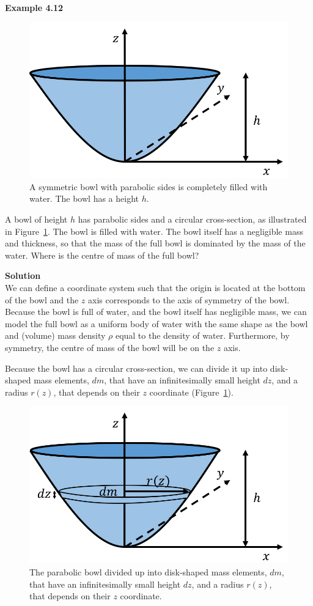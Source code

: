 \begin{framed}
\textbf{Example 4.12}\\
\begin{figure}[!htbp]
\centering
\includegraphics[width=0.5\linewidth]{files/cmbowl-1d1b369d890b85728f882628aa960aeb.png}
\caption[]{A symmetric bowl with parabolic sides is completely filled with water. The bowl has a height $h$.}
\label{fig:momentumandcm:cmbowl}
\end{figure}

A bowl of height $h$ has parabolic sides and a circular cross-section, as illustrated in Figure~\ref{fig:momentumandcm:cmbowl}. The bowl is filled with water. The bowl itself has a negligible mass and thickness, so that the mass of the full bowl is dominated by the mass of the water. Where is the centre of mass of the full bowl?

\begin{framed}
\textbf{Solution}\\
We can define a coordinate system such that the origin is located at the bottom of the bowl and the $z$ axis corresponds to the axis of symmetry of the bowl. Because the bowl is full of water, and the bowl itself has negligible mass, we can model the full bowl as a uniform body of water with the same shape as the bowl and (volume) mass density $\rho$ equal to the density of water. Furthermore, by symmetry, the centre of mass of the bowl will be on the $z$ axis.

Because the bowl has a circular cross-section, we can divide it up into disk-shaped mass elements, $dm$, that have an infinitesimally small height $dz$, and a radius $r(z)$, that depends on their $z$ coordinate (Figure~\ref{fig:momentumandcm:cmbowl}).

\begin{figure}[!htbp]
\centering
\includegraphics[width=0.5\linewidth]{files/cmbowlsoln-46d95246606d9afbfcb46d896208050a.png}
\caption[]{The parabolic bowl divided up into disk-shaped mass elements, $dm$, that have an infinitesimally small height $dz$, and a radius $r(z)$, that depends on their $z$ coordinate.}
\label{fig:momentumandcm:cmbowlsoln}
\end{figure}


\end{framed}
\end{framed}
